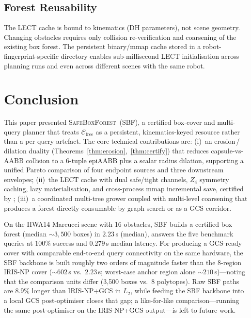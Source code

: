 \documentclass[journal]{IEEEtran}
\newcommand{\Cfree}{\mathcal{C}_{\mathrm{free}}}
\begin{document}
\subsection{Forest Reusability}

The LECT cache is bound to kinematics (DH parameters), not scene
geometry.
Changing obstacles requires only collision re-verification and
coarsening of the existing box forest.
The persistent binary/mmap cache stored in a robot-fingerprint-specific
directory enables sub-millisecond
LECT initialisation across planning runs and even across different
scenes with the same robot.

\section{Conclusion}\label{sec:conclusion}

This paper presented \textsc{SafeBoxForest}~(SBF), a certified
box-cover and multi-query planner that treats $\Cfree$ as a
persistent, kinematics-keyed resource rather than a per-query
artefact. The core technical contributions are: (i)~an erosion\,/\,
dilation duality (Theorems~\ref{thm:erosion},~\ref{thm:certify})
that reduces capsule-vs-AABB collision to a 6-tuple epiAABB plus a
scalar radius dilation, supporting a unified Pareto comparison of
four endpoint sources and three downstream envelopes;
(ii)~the LECT cache with dual safe/tight channels, $Z_4$ symmetry
caching, lazy materialisation, and cross-process mmap incremental
save, certified by ;
(iii)~a coordinated multi-tree grower coupled with multi-level
coarsening that produces a forest directly consumable by graph
search or as a GCS corridor.

On the IIWA14 Marcucci scene with 16 obstacles, SBF builds a
certified box forest (median ${\sim}3{,}500$ boxes) in $2.23$\,s
(median), answers the five benchmark queries at $100\%$ success and
$0.279$\,s median latency. For producing a GCS-ready cover with
comparable end-to-end query connectivity on the same hardware, the
SBF backbone is built roughly two orders of magnitude faster than the
8-region IRIS-NP cover (${\sim}602$\,s vs.\ $2.23$\,s; worst-case
anchor region alone ${\sim}210$\,s)---noting that the comparison
units differ (3{,}500 boxes vs.\ 8 polytopes).
Raw SBF paths are $8.9\%$ longer than IRIS-NP+GCS in $L_2$, while
feeding the SBF backbone into a local GCS post-optimiser closes
that gap; a like-for-like comparison---running the same
post-optimiser on the IRIS-NP+GCS output---is left to future work.
\end{document}
